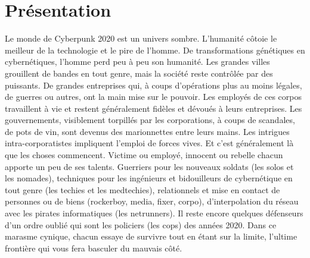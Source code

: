 
\date{} %
\maketitle{}
\tableofcontents

\section{Présentation}

Le monde de Cyberpunk 2020 est un univers sombre.
L'humanité côtoie le meilleur de la technologie et le pire de l'homme.
De transformations génétiques en cybernétiques, l'homme perd peu à peu son humanité.
Les grandes villes grouillent de bandes en tout genre, mais la société reste contrôlée par des puissants.
De grandes entreprises qui, à coups d'opérations plus au moins légales,
de guerres ou autres, ont la main mise sur le pouvoir.
Les employés de ces corpos travaillent à vie et restent généralement fidèles et dévoués à leurs entreprises.
Les gouvernements, visiblement torpillés par les corporations, à coups de scandales, de pots de vin,
sont devenus des marionnettes entre leurs mains.
Les intrigues intra-corporatistes impliquent l'emploi de forces vives.
Et c'est généralement là que les choses commencent. Victime ou employé,
innocent ou rebelle chacun apporte un peu de ses talents. Guerriers pour les nouveaux soldats
(les solos et les nomades), techniques pour les ingénieurs et bidouilleurs de cybernétique en tout genre
(les techies et les medtechies), relationnels et mise en contact de personnes ou de biens
(rockerboy, media, fixer, corpo), d'interpolation du réseau avec les pirates informatiques (les netrunners).
Il reste encore quelques défenseurs d'un ordre oublié qui sont les policiers (les cops) des années 2020.
Dans ce marasme cynique, chacun essaye de survivre tout en étant sur la limite,
l'ultime frontière qui vous fera basculer du mauvais côté.

